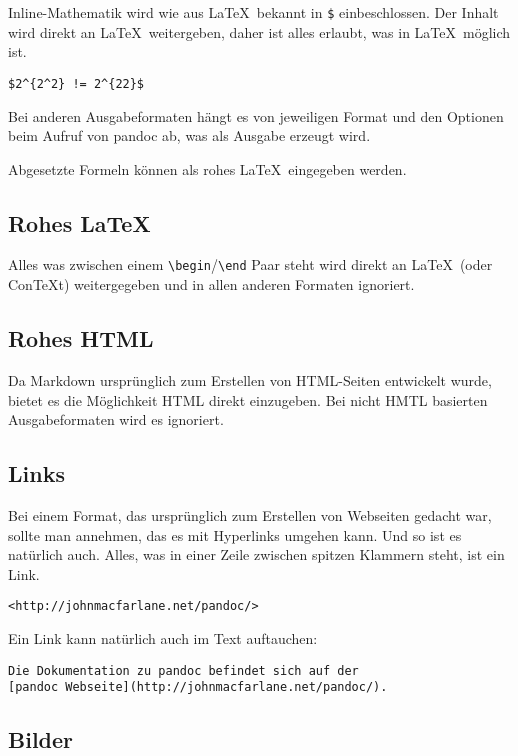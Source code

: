\documentclass[11pt,ngerman,a4paper]{article}
\begin{document}
Inline-Mathematik wird wie aus LaTeX~bekannt in \texttt{\$}
einbeschlossen. Der Inhalt wird direkt an LaTeX~weitergeben, daher ist
alles erlaubt, was in LaTeX~möglich ist.

\begin{verbatim}
$2^{2^2} != 2^{22}$
\end{verbatim}

Bei anderen Ausgabeformaten hängt es von jeweiligen Format und den
Optionen beim Aufruf von pandoc ab, was als Ausgabe erzeugt wird.

Abgesetzte Formeln können als rohes LaTeX~eingegeben werden.

\subsection{Rohes LaTeX}

Alles was zwischen einem
\texttt{\textbackslash{}begin}/\texttt{\textbackslash{}end} Paar steht
wird direkt an LaTeX~(oder ConTeXt) weitergegeben und in allen anderen
Formaten ignoriert.

\subsection{Rohes HTML}

Da Markdown ursprünglich zum Erstellen von HTML-Seiten entwickelt wurde,
bietet es die Möglichkeit HTML direkt einzugeben. Bei nicht HMTL
basierten Ausgabeformaten wird es ignoriert.

\subsection{Links}

Bei einem Format, das ursprünglich zum Erstellen von Webseiten gedacht
war, sollte man annehmen, das es mit Hyperlinks umgehen kann. Und so ist
es natürlich auch. Alles, was in einer Zeile zwischen spitzen Klammern
steht, ist ein Link.

\begin{verbatim}
<http://johnmacfarlane.net/pandoc/>
\end{verbatim}

Ein Link kann natürlich auch im Text auftauchen:

\begin{verbatim}
Die Dokumentation zu pandoc befindet sich auf der
[pandoc Webseite](http://johnmacfarlane.net/pandoc/).
\end{verbatim}

\subsection{Bilder}
\end{document}
